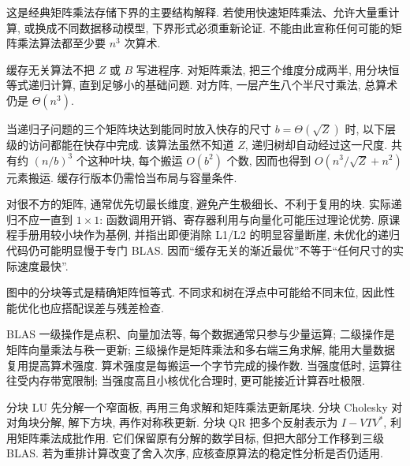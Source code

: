 这是经典矩阵乘法存储下界的主要结构解释. 若使用快速矩阵乘法、允许大量重计算, 或换成不同数据移动模型, 下界形式必须重新论证. 不能由此宣称任何可能的矩阵乘法算法都至少要 $n^3$ 次算术.

缓存无关算法不把 $Z$ 或 $B$ 写进程序. 对矩阵乘法, 把三个维度分成两半, 用分块恒等式递归计算, 直到足够小的基础问题. 对方阵, 一层产生八个半尺寸乘法, 总算术仍是 $\Theta(n^3)$.

当递归子问题的三个矩阵块达到能同时放入快存的尺寸 $b=\Theta(\sqrt Z)$ 时, 以下层级的访问都能在快存中完成. 该算法虽然不知道 $Z$, 递归树却自动经过这一尺度. 共有约 $(n/b)^3$ 个这种叶块, 每个搬运 $O(b^2)$ 个数, 因而也得到 $O(n^3/\sqrt Z+n^2)$ 元素搬运. 缓存行版本仍需恰当布局与容量条件.

对很不方的矩阵, 通常优先切最长维度, 避免产生极细长、不利于复用的块. 实际递归不应一直到 $1\times1$: 函数调用开销、寄存器利用与向量化可能压过理论优势. 原课程手册用较小块作为基例, 并指出即便消除 L1/L2 的明显容量断崖, 未优化的递归代码仍可能明显慢于专门 BLAS. 因而“缓存无关的渐近最优”不等于“任何尺寸的实际速度最快”.

\begin{center}
\end{center}
图中的分块等式是精确矩阵恒等式. 不同求和树在浮点中可能给不同末位, 因此性能优化也应搭配误差与残差检查.

BLAS 一级操作是点积、向量加法等, 每个数据通常只参与少量运算; 二级操作是矩阵向量乘法与秩一更新; 三级操作是矩阵乘法和多右端三角求解, 能用大量数据复用提高算术强度. 算术强度是每搬运一个字节完成的操作数. 当强度低时, 运算往往受内存带宽限制; 当强度高且小核优化合理时, 更可能接近计算吞吐极限.

分块 LU 先分解一个窄面板, 再用三角求解和矩阵乘法更新尾块. 分块 Cholesky 对对角块分解, 解下方块, 再作对称秩更新. 分块 QR 把多个反射表示为 $I-VTV^*$, 利用矩阵乘法成批作用. 它们保留原有分解的数学目标, 但把大部分工作移到三级 BLAS. 若为重排计算改变了舍入次序, 应核查原算法的稳定性分析是否仍适用.

